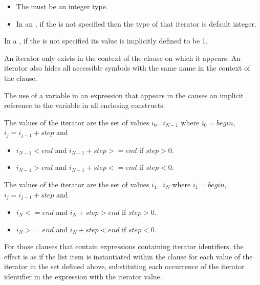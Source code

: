 
\begin{fortranspecific}
\begin{itemize}
\item The  must be an integer type.
\item In an , if the  is not specified then the type of that iterator is default integer.
\end{itemize}
\end{fortranspecific}

In a , if the  is not specified its value is implicitly defined to be 1.

An iterator only exists in the context of the clause on which it appears. An iterator also hides all accessible symbols with the same name in the context of the clause.

The use of a variable in an expression that appears in the  causes an implicit reference to the variable in all enclosing constructs.

\begin{ccppspecific}
The values of the iterator are the set of values $i_{0}$...$i_{N-1}$ where $i_{0}=begin$,  $i_{j}=i_{j-1} + step$ and
\begin{itemize}
\item $i_{N-1} < end$ and $i_{N-1} + step >= end$ if $step > 0$.
\item $i_{N-1} > end$ and $i_{N-1} + step <= end$ if $step < 0$.
\end{itemize}
\end{ccppspecific}
\begin{fortranspecific}
The values of the iterator are the set of values $i_{1}$...$i_{N}$ where $i_{1}=begin$,  $i_{j}=i_{j-1} + step$ and
\begin{itemize}
\item $i_{N} <= end$ and $i_{N} + step > end$ if $step > 0$.
\item $i_{N} >= end$ and $i_{N} + step < end$ if $step < 0$.
\end{itemize}
\end{fortranspecific}

 For those clauses that contain expressions containing iterator identifiers, the
effect is as if the list item is instantiated within the clause for each
value of the iterator in the set defined above, substituting each occurrence of
the iterator identifier in the expression with the iterator value.

